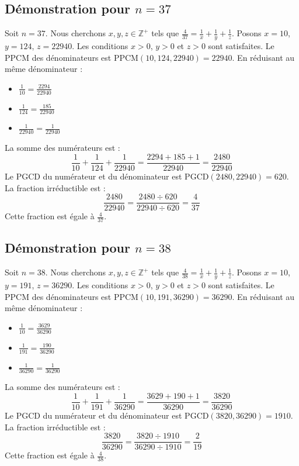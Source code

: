 \documentclass[11pt,a4paper]{article}
\begin{document}
\subsection{Démonstration pour $n = 37$}
Soit $n = 37$. Nous cherchons $x, y, z \in \mathbb{Z}^{+}$ tels que $\frac{4}{37} = \frac{1}{x} + \frac{1}{y} + \frac{1}{z}$.
Posons $x = 10$, $y = 124$, $z = 22940$.
Les conditions $x > 0$, $y > 0$ et $z > 0$ sont satisfaites.
Le PPCM des dénominateurs est $\text{PPCM}(10, 124, 22940) = 22940$.
En réduisant au même dénominateur :
\begin{itemize}
    \item $\frac{1}{10} = \frac{2294}{22940}$
    \item $\frac{1}{124} = \frac{185}{22940}$
    \item $\frac{1}{22940} = \frac{1}{22940}$
\end{itemize}
La somme des numérateurs est :
$$ \frac{1}{10} + \frac{1}{124} + \frac{1}{22940} = \frac{2294 + 185 + 1}{22940} = \frac{2480}{22940} $$
Le PGCD du numérateur et du dénominateur est $\text{PGCD}(2480, 22940) = 620$.
La fraction irréductible est :
$$ \frac{2480}{22940} = \frac{2480 \div 620}{22940 \div 620} = \frac{4}{37} $$
Cette fraction est égale à $\frac{4}{37}$.

\subsection{Démonstration pour $n = 38$}
Soit $n = 38$. Nous cherchons $x, y, z \in \mathbb{Z}^{+}$ tels que $\frac{4}{38} = \frac{1}{x} + \frac{1}{y} + \frac{1}{z}$.
Posons $x = 10$, $y = 191$, $z = 36290$.
Les conditions $x > 0$, $y > 0$ et $z > 0$ sont satisfaites.
Le PPCM des dénominateurs est $\text{PPCM}(10, 191, 36290) = 36290$.
En réduisant au même dénominateur :
\begin{itemize}
    \item $\frac{1}{10} = \frac{3629}{36290}$
    \item $\frac{1}{191} = \frac{190}{36290}$
    \item $\frac{1}{36290} = \frac{1}{36290}$
\end{itemize}
La somme des numérateurs est :
$$ \frac{1}{10} + \frac{1}{191} + \frac{1}{36290} = \frac{3629 + 190 + 1}{36290} = \frac{3820}{36290} $$
Le PGCD du numérateur et du dénominateur est $\text{PGCD}(3820, 36290) = 1910$.
La fraction irréductible est :
$$ \frac{3820}{36290} = \frac{3820 \div 1910}{36290 \div 1910} = \frac{2}{19} $$
Cette fraction est égale à $\frac{4}{38}$.
\end{document}
